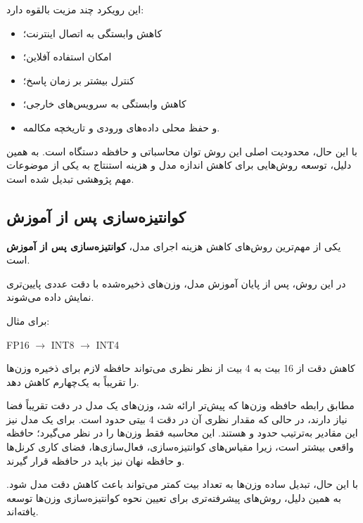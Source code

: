 این رویکرد چند مزیت بالقوه دارد:

\begin{itemize}

    \item کاهش وابستگی به اتصال اینترنت؛

    \item امکان استفاده آفلاین؛

    \item کنترل بیشتر بر زمان پاسخ؛

    \item کاهش وابستگی به سرویس‌های خارجی؛

    \item و حفظ محلی داده‌های ورودی و تاریخچه مکالمه.

\end{itemize}

با این حال، محدودیت اصلی این روش توان محاسباتی و حافظه
دستگاه است.
به همین دلیل، توسعه روش‌هایی برای کاهش اندازه مدل و هزینه
استنتاج به یکی از موضوعات مهم پژوهشی تبدیل شده است.


\subsection{کوانتیزه‌سازی پس از آموزش}

یکی از مهم‌ترین روش‌های کاهش هزینه اجرای مدل،
\textbf{کوانتیزه‌سازی پس از آموزش}
است.

در این روش، پس از پایان آموزش مدل، وزن‌های ذخیره‌شده با دقت
عددی پایین‌تری نمایش داده می‌شوند.

برای مثال:

\begin{center}
FP16
$\longrightarrow$
INT8
$\longrightarrow$
INT4
\end{center}

کاهش دقت از 16 بیت به 4 بیت از نظر نظری می‌تواند حافظه لازم
برای ذخیره وزن‌ها را تقریباً به یک‌چهارم کاهش دهد.

مطابق رابطه حافظه وزن‌ها که پیش‌تر ارائه شد، وزن‌های یک مدل
 در دقت  تقریباً
 فضا نیاز دارند، در حالی که مقدار نظری آن در دقت 4 بیتی
حدود  است. برای یک مدل  نیز این مقادیر به‌ترتیب
حدود  و  هستند. این محاسبه فقط وزن‌ها را در نظر
می‌گیرد؛ حافظه واقعی بیشتر است، زیرا مقیاس‌های کوانتیزه‌سازی،
فعال‌سازی‌ها، فضای کاری کرنل‌ها و حافظه نهان  نیز باید در
حافظه قرار گیرند.

با این حال، تبدیل ساده وزن‌ها به تعداد بیت کمتر می‌تواند
باعث کاهش دقت مدل شود.
به همین دلیل، روش‌های پیشرفته‌تری برای تعیین نحوه کوانتیزه‌سازی
وزن‌ها توسعه یافته‌اند.


